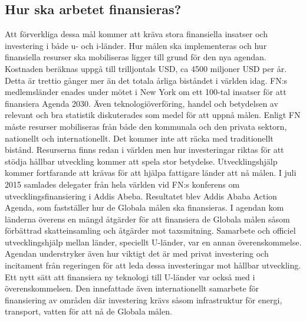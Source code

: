 \documentclass{report}
\begin{document}
\subsection{Hur ska arbetet finansieras?} 
Att förverkliga dessa mål kommer att kräva stora finansiella insatser och  investering i både u- och i-länder. \cite{web2030agenda}
Hur målen ska implementeras och hur finansiella resurser ska mobiliseras ligger till grund för den nya agendan. \cite{webUNASweden}
Kostnaden beräknas uppgå till trilljontals USD, \cite{web2030agenda} ca 4500 miljoner USD per år. Detta är trettio gånger mer än det totala årliga biståndet i världen idag. \cite{webUNICEF} FN:s medlemsländer enades under mötet i New York om ett 100-tal insatser för att finansiera Agenda 2030. Även teknologiöverföring, handel och betydelsen av relevant och bra statistik diskuterades som medel för att uppnå målen. \cite{webUNASweden}
Enligt FN måste resurser mobiliseras från både den kommunala och den privata sektorn, nationellt och internationellt. Det kommer inte att räcka med traditionellt bistånd. Resurserna finns redan i världen men hur investeringar riktas för att stödja hållbar utveckling kommer att spela stor betydelse. Utvecklingshjälp kommer fortfarande att krävas för att hjälpa fattigare länder att nå målen. 
\cite{web2030agenda}
I juli 2015 samlades delegater från hela världen vid FN:s konferens om utvecklingsfinansiering i Addis Abeba. Resultatet blev Addis Ababa Action Agenda, som fastställer hur de Globala målen ska finansieras. \cite{SIDA}
I agendan kom länderna överens en mängd åtgärder för att finansiera de Globala målen såsom förbättrad skatteinsamling och åtgärder mot taxsmitning. Samarbete och officiel utvecklingshjälp mellan länder, speciellt U-länder, var en annan överenskommelse. Agendan understryker även hur viktigt det är med privat investering och incitament från regeringen för att leda dessa investeringar mot hållbar utveckling. Ett nytt sätt att finansiera ny teknologi till U-länder var också med i överenskommelsen. Den innefattade även internationellt samarbete för finansiering av områden där investering krävs såsom infrastruktur för energi, transport, vatten för att nå de Globala målen.  
\cite{webUNDESA}\\
\end{document}
